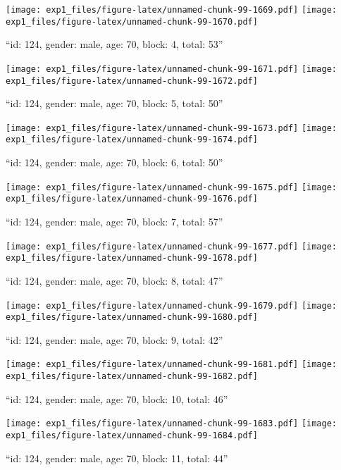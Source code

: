 \documentclass[,]{article}
\begin{document}
\texttt{[image: exp1\_files/figure-latex/unnamed-chunk-99-1669.pdf]}
\texttt{[image: exp1\_files/figure-latex/unnamed-chunk-99-1670.pdf]}

\newpage
[1] 

``id: 124, gender: male, age: 70, block: 4, total: 53''

\texttt{[image: exp1\_files/figure-latex/unnamed-chunk-99-1671.pdf]}
\texttt{[image: exp1\_files/figure-latex/unnamed-chunk-99-1672.pdf]}

\newpage
[1] 

``id: 124, gender: male, age: 70, block: 5, total: 50''

\texttt{[image: exp1\_files/figure-latex/unnamed-chunk-99-1673.pdf]}
\texttt{[image: exp1\_files/figure-latex/unnamed-chunk-99-1674.pdf]}

\newpage
[1] 

``id: 124, gender: male, age: 70, block: 6, total: 50''

\texttt{[image: exp1\_files/figure-latex/unnamed-chunk-99-1675.pdf]}
\texttt{[image: exp1\_files/figure-latex/unnamed-chunk-99-1676.pdf]}

\newpage
[1] 

``id: 124, gender: male, age: 70, block: 7, total: 57''

\texttt{[image: exp1\_files/figure-latex/unnamed-chunk-99-1677.pdf]}
\texttt{[image: exp1\_files/figure-latex/unnamed-chunk-99-1678.pdf]}

\newpage
[1] 

``id: 124, gender: male, age: 70, block: 8, total: 47''

\texttt{[image: exp1\_files/figure-latex/unnamed-chunk-99-1679.pdf]}
\texttt{[image: exp1\_files/figure-latex/unnamed-chunk-99-1680.pdf]}

\newpage
[1] 

``id: 124, gender: male, age: 70, block: 9, total: 42''

\texttt{[image: exp1\_files/figure-latex/unnamed-chunk-99-1681.pdf]}
\texttt{[image: exp1\_files/figure-latex/unnamed-chunk-99-1682.pdf]}

\newpage
[1] 

``id: 124, gender: male, age: 70, block: 10, total: 46''

\texttt{[image: exp1\_files/figure-latex/unnamed-chunk-99-1683.pdf]}
\texttt{[image: exp1\_files/figure-latex/unnamed-chunk-99-1684.pdf]}

\newpage
[1] 

``id: 124, gender: male, age: 70, block: 11, total: 44''
\end{document}
